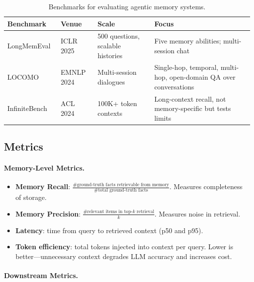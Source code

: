 \begin{table}[ht!]
\centering
\caption{Benchmarks for evaluating agentic memory systems.}
\begin{tabular}{@{}lp{3.5cm}p{3.5cm}p{6cm}@{}}
\toprule
\textbf{Benchmark} & \textbf{Venue} & \textbf{Scale} & \textbf{Focus} \\
\midrule
LongMemEval~\cite{wu2024longmemeval} & ICLR 2025 & 500 questions, scalable histories & Five memory abilities; multi-session chat \\
LOCOMO~\cite{maharana2024locomo} & EMNLP 2024 & Multi-session dialogues & Single-hop, temporal, multi-hop, open-domain QA over conversations \\
InfiniteBench~\cite{zhang2024infinitebench} & ACL 2024 & 100K+ token contexts & Long-context recall, not memory-specific but tests limits \\
\bottomrule
\end{tabular}
\end{table}

\subsection{Metrics}
\label{metrics}

\paragraph{Memory-Level Metrics.}
\label{memory-level-metrics.}

\begin{itemize}
  \item \textbf{Memory Recall}: $\frac{\text{\# ground-truth facts retrievable from memory}}{\text{\# total ground-truth facts}}$. Measures completeness of storage.
  \item \textbf{Memory Precision}: $\frac{\text{\# relevant items in top-}k\text{ retrieval}}{k}$. Measures noise in retrieval.
  \item \textbf{Latency}: time from query to retrieved context (p50 and p95).
  \item \textbf{Token efficiency}: total tokens injected into context per query. Lower is better---unnecessary context degrades LLM accuracy and increases cost.
\end{itemize}

\paragraph{Downstream Metrics.}
\label{downstream-metrics.}

